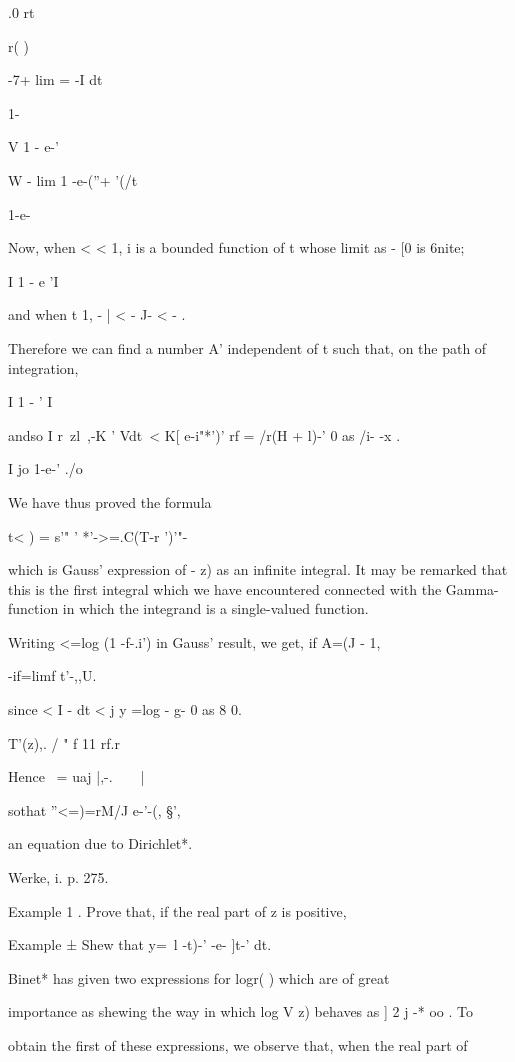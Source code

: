 .0 rt%

r( )

-7+ lim = -I dt

1-

V 1 - e-'

W - lim 1 -e-(''+ '(/t

1-e-

Now, when < < 1, i is a bounded function of t whose limit as - [0 is
6nite;

I 1 - e 'I

and when t 1, - | < - J- < - .

Therefore we can find a number A' independent of t such that, on the
path of integration,

I 1 - ' I

andso I r\ zl~,-K ' Vdt\ < K[ e-i"*')' rf = /r(H + l)-' 0 as /i- -x .

I jo 1-e-' ./o

We have thus proved the formula

t< ) = s'" ' *'->=.C(T-r ')'"-

which is Gauss' expression of - z) as an infinite integral. It may be
remarked that this is the first integral which we have encountered
connected with the Gamma-function in which the integrand is a
single-valued function.

Writing <=log (1 -f-.i') in Gauss' result, we get, if A=(J - 1,

 -if=limf t'-,,U.

since < I - dt < j y =log - g- 0 as 8 0.

T'(z),. / " f 11 rf.r

Hence \ = uaj |,-.\ \ \ \ |\,

sothat ''<=)=rM/J e-'-(, §',

an equation due to Dirichlet*.

Werke, i. p. 275.

%
%

Example 1 . Prove that, if the real part of z is positive,

Example ± Shew that y=\ l -t)-' -e- ]t-' dt. 


Binet* has given two expressions for logr( ) which are of
great

importance as shewing the way in which log V z) behaves as ] 2 j -* oo
. To

obtain the first of these expressions, we observe that, when the real
part of

